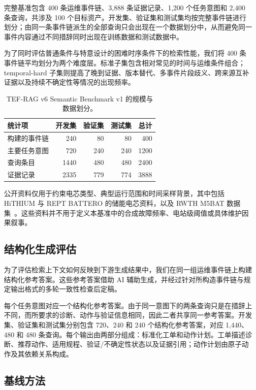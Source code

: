 完整基准包含 400 条运维事件链、3,888 条证据记录、1,200 个任务意图和 2,400 条查询，共涉及 100 个目标资产。开发集、验证集和测试集均按完整事件链进行划分；由同一条事件链派生的全部查询只会出现在一个数据划分中，从而避免同一事件内容通过不同措辞同时出现在训练数据和测试数据中。

为了同时评估普通条件与特意设计的困难时序条件下的检索性能，我们将 400 条事件链平均划分为两个难度层。标准子集包含相对常见的时间与运维条件组合；temporal-hard 子集则提高了晚到证据、版本替代、多事件片段歧义、跨来源互补证据以及持续不确定性等情况的出现频率。

\begin{table}[t]
\caption{TEF-RAG v6 Semantic Benchmark v1 的规模与数据划分。}
\label{tab:dataset_stats}
\centering
\small
\begin{tabular}{lrrrr}
\toprule
统计项 & 开发集 & 验证集 & 测试集 & 总计 \\
\midrule
构建的事件链 & 240 & 80 & 80 & 400 \\
主要任务意图 & 720 & 240 & 240 & 1200 \\
查询条目 & 1440 & 480 & 480 & 2400 \\
证据记录 & 2335 & 779 & 774 & 3888 \\
\bottomrule
\end{tabular}
\end{table}

公开资料仅用于约束电芯类型、典型运行范围和时间采样背景，其中包括 HiTHIUM 与 REPT BATTERO 的储能电芯资料，以及 RWTH M5BAT 数据集~\cite{hithium2023v11,hithium2024v33,rept2025,rwth2026m5bat}。这些资料并不用于定义本基准中的合成故障频率、电站级阈值或具体维护因果叙事。

\subsection{结构化生成评估}

为了评估检索上下文如何反映到下游生成结果中，我们在同一组运维事件链上构建结构化参考答案。这些参考答案借助 AI 辅助生成，并经过针对所构造事件链与规定输出格式的多轮一致性检查后定稿。

每个任务意图对应一个结构化参考答案。由于同一意图下的两条查询只是在措辞上不同，而所要求的诊断、动作与验证信息相同，因此二者共享同一参考答案。开发集、验证集和测试集分别包含 720、240 和 240 个结构化参考答案，对应 1,440、480 和 480 条查询。每个输出由两部分组成：标准化工单和动作计划。工单描述诊断、推荐动作、适用规程、验证/不确定性状态以及证据引用；动作计划由原子动作及其依赖关系构成。

\subsection{基线方法}
\label{sec:baselines}

